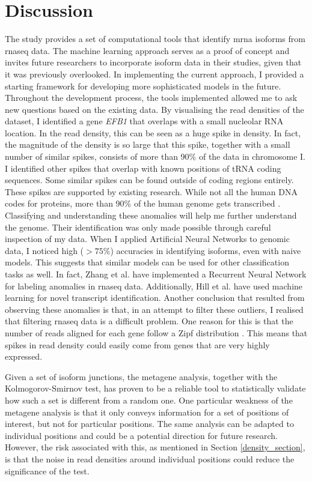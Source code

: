 \documentclass[12pt]{article}
\begin{document}
\section{Discussion}\label{disc}
The study provides a set of computational tools that identify \acrshort{mrna} isoforms from \acrshort{rnaseq} data. The machine learning approach serves as a proof of concept and invites future researchers to incorporate isoform data in their studies, given that it was previously overlooked. In implementing the current approach, I provided a starting framework for developing more sophisticated models in the future. 
Throughout the development process, the tools implemented allowed me to ask new questions based on the existing data. By visualising the read densities of the dataset, I identified a gene \textit{EFB1} that overlaps with a small nucleolar RNA location. In the read density, this can be seen as a huge spike in density. In fact, the magnitude of the density is so large that this spike, together with a small number of similar spikes, consists of more than 90\% of the data in chromosome I. I identified other spikes that overlap with known positions of tRNA coding sequences. Some similar spikes can be found outside of coding regions entirely.  These spikes are supported by existing research. While not all the human DNA codes for proteins, more than 90\% of the human genome gets transcribed \cite{Pertea2012}. Classifying and understanding these anomalies will help me further understand the genome. Their identification was only made possible through careful inspection of my data. When I applied Artificial Neural Networks to genomic data, I noticed high ($>75\%$) accuracies in identifying isoforms, even with naive models. This suggests that similar models can be used for other classification tasks as well. In fact, Zhang et al. \cite{Zhang2017} have implemented a Recurrent Neural Network for labeling anomalies in \acrshort{rnaseq} data. Additionally, Hill et al. \cite{Hill2018} have used machine learning for novel transcript identification. Another conclusion that resulted from observing these anomalies is that, in an attempt to filter these outliers, I realised that filtering \acrshort{rnaseq} data is a difficult problem. One reason for this is that the number of reads aligned for each gene follow a Zipf distribution \cite{PhysRevLett.90.088102}. This means that spikes in read density could easily come from genes that are very highly expressed. 
 

Given a set of isoform junctions, the metagene analysis, together with the Kolmogorov-Smirnov test, has proven to be a reliable tool to statistically validate how such a set is different from a random one. One particular weakness of the metagene analysis is that it only conveys information for a set of positions of interest, but not for particular positions. The same analysis can be adapted to individual positions and could be a potential direction for future research. However, the risk associated with this, as mentioned in Section \ref{density_section}, is that the noise in read densities around individual positions could reduce the significance of the test. 
\end{document}
